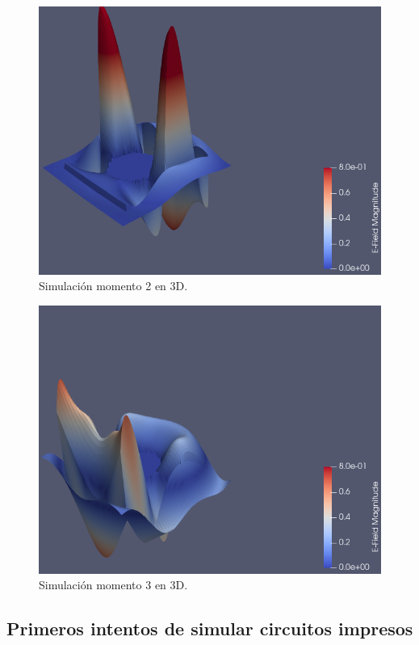 \documentclass[
    11pt,
    spanish,
    a4paper
]{article}
\begin{document}
\begin{figure}[htbp]
	\centering
	\includegraphics[width=\textwidth]{./img/mitad3d.png}
	\caption{Simulación momento 2 en 3D.}
	\label{fig:sim8}
\end{figure}

\begin{figure}[htbp]
	\centering
	\includegraphics[width=\textwidth]{./img/salida3d.png}
	\caption{Simulación momento 3 en 3D.}
	\label{fig:sim9}
\end{figure}

\subsection{Primeros intentos de simular circuitos impresos}
\end{document}
